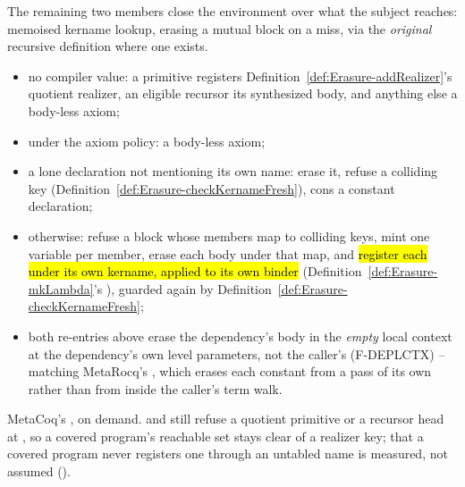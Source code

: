 \begin{definition}
\label{def:Erasure-visitMutual}
\leanok
{} The remaining two members close the environment over what the subject reaches:
memoised kername lookup, erasing a mutual block on a miss, via the \emph{original} recursive
definition where one exists.
\begin{itemize}
\item no compiler value: a  primitive registers Definition~\ref{def:Erasure-addRealizer}'s
quotient realizer, an eligible recursor its synthesized  body, and anything else a
body-less axiom;
\item {} under the axiom policy: a body-less axiom;
\item a lone declaration not mentioning its own name: erase it, refuse a colliding key
(Definition~\ref{def:Erasure-checkKernameFresh}), cons a constant declaration;
\item otherwise: refuse a block whose members map to colliding keys, mint one variable per
member, erase each body under that map, and \hl{register each under its own kername, applied to
its own binder} (Definition~\ref{def:Erasure-mkLambda}'s ), guarded again by
Definition~\ref{def:Erasure-checkKernameFresh};
\item both re-entries above erase the dependency's body in the \emph{empty} local context at the
dependency's own level parameters, not the caller's (F-DEPLCTX) -- matching MetaRocq's
, which erases each constant from a pass of its own rather than from
inside the caller's term walk.
\end{itemize}
\end{definition}

\begin{remark}
 MetaCoq's , on demand. 
and  still refuse a quotient primitive or a recursor head at
, so a covered program's reachable set stays clear of a realizer key; that a
covered program never registers one through an untabled name is measured, not assumed
().
\end{remark}

